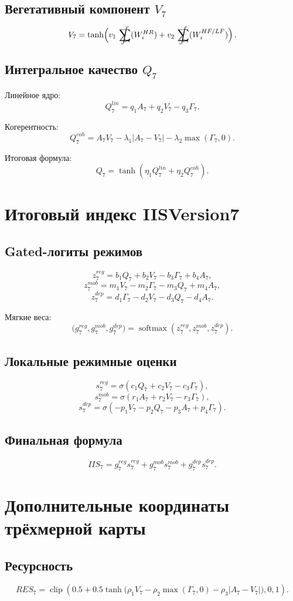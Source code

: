\documentclass[12pt,a4paper]{article}
\newcommand{\sgsumintright}[1]{\mathop{\mathchoice
  {\ooalign{
    \hfil$\displaystyle\sum$\hfil\cr
    \hfil$\displaystyle\int$\hfil\cr
    \hidewidth\raisebox{-1.35ex}{\kern1.25ex$\scriptstyle #1$}\hidewidth\cr
  }}
  {\ooalign{
    \hfil$\textstyle\sum$\hfil\cr
    \hfil$\textstyle\int$\hfil\cr
    \hidewidth\raisebox{-1.00ex}{\kern1.00ex$\scriptscriptstyle #1$}\hidewidth\cr
  }}
  {\ooalign{
    \hfil$\scriptstyle\sum$\hfil\cr
    \hfil$\scriptstyle\int$\hfil\cr
    \hidewidth\raisebox{-0.75ex}{\kern0.75ex$\scriptscriptstyle #1$}\hidewidth\cr
  }}
  {\ooalign{
    \hfil$\scriptscriptstyle\sum$\hfil\cr
    \hfil$\scriptscriptstyle\int$\hfil\cr
    \hidewidth\raisebox{-0.60ex}{\kern0.55ex$\scriptscriptstyle #1$}\hidewidth\cr
  }}
}}
\newcommand{\sgop}{\sgsumintright{\bowtie}}
\newcommand{\sigmoid}{\sigma}
\begin{document}
\subsection{Вегетативный компонент \(V_7\)}
\[
V_7=
\tanh\!\left(
v_1\,\sgop(W^{HR}_i)
+v_2\,\sgop(W^{HF/LF}_i)
\right).
\]

\subsection{Интегральное качество \(Q_7\)}
Линейное ядро:
\[
Q^{lin}_7=q_1A_7+q_2V_7-q_3\Gamma_7.
\]

Когерентность:
\[
Q^{coh}_7=A_7V_7-\lambda_1|A_7-V_7|-\lambda_2\max(\Gamma_7,0).
\]

Итоговая формула:
\[
Q_7=
\tanh\!\left(
\eta_1Q^{lin}_7+\eta_2Q^{coh}_7
\right).
\]

\section{Итоговый индекс IISVersion7}
\subsection{Gated-логиты режимов}
\[
z^{reg}_7=b_1Q_7+b_2V_7-b_3\Gamma_7+b_4A_7,
\]
\[
z^{mob}_7=m_1V_7-m_2\Gamma_7-m_3Q_7+m_4A_7,
\]
\[
z^{dep}_7=d_1\Gamma_7-d_2V_7-d_3Q_7-d_4A_7.
\]

Мягкие веса:
\[
\bigl(g^{reg}_7,g^{mob}_7,g^{dep}_7\bigr)
=
\operatorname{softmax}(z^{reg}_7,z^{mob}_7,z^{dep}_7).
\]

\subsection{Локальные режимные оценки}
\[
s^{reg}_7=\sigmoid(c_1Q_7+c_2V_7-c_3\Gamma_7),
\]
\[
s^{mob}_7=\sigmoid(r_1A_7+r_2V_7-r_3\Gamma_7),
\]
\[
s^{dep}_7=\sigmoid(-p_1V_7-p_2Q_7-p_3A_7+p_4\Gamma_7).
\]

\subsection{Финальная формула}
\[
IIS_7=
g^{reg}_7 s^{reg}_7
+g^{mob}_7 s^{mob}_7
+g^{dep}_7 s^{dep}_7.
\]

\section{Дополнительные координаты трёхмерной карты}
\subsection{Ресурсность}
\[
RES_7=
\operatorname{clip}\!\left(
0.5+0.5\tanh\!\bigl(
\rho_1V_7-\rho_2\max(\Gamma_7,0)-\rho_3|A_7-V_7|
\bigr),
0,1
\right).
\]
\end{document}
